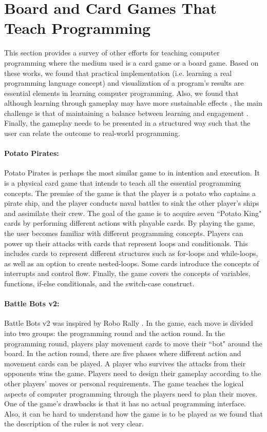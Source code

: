 \section{Board and Card Games That Teach Programming}

This section provides a survey of other efforts for teaching computer programming where the medium used is a card game or a board game. 
Based on these works, we found that practical implementation (i.e. learning a real programming language concept) and visualization of a program's results are essential elements in learning computer programming. Also, we found that although learning through gameplay may have more sustainable effects \cite{effectivenessofgames}, the main challenge is that of maintaining a balance between learning and engagement \cite{educationalgamedesign}. Finally, the gameplay needs to be presented in a structured way such that the user can relate the outcome to real-world programming.

\paragraph{Potato Pirates:}
Potato Pirates \cite{PotatoPirates} is perhaps the most similar game to \gameName in intention and execution. It is a physical card game that intends to teach all the essential programming concepts. The premise of the game is that the player is a potato who captains a pirate ship, and the player conducts naval battles to sink the other player's ships and assimilate their crew. The goal of the game is to acquire seven ``Potato King" cards by performing different actions with playable cards. By playing the game, the user becomes familiar with different programming concepts. Players can power up their attacks with cards that represent loops and conditionals. This includes cards to represent different structures such as for-loops and while-loops, as well as an option to create nested-loops. Some cards introduce the concepts of interrupts and control flow. Finally, the game covers the concepts of variables, functions, if-else conditionals, and the switch-case construct.

\paragraph{Battle Bots v2:}
Battle Bots v2 \cite{BattleBotsv2}  was inspired by Robo Rally \cite{roborally}. In the game, each move is divided into two groups: the programming round and the action round. In the programming round, players play movement cards to move their ``bot" around the board. In the action round, there are five phases where different action and movement cards can be played. A player who survives the attacks from their opponents wins the game. Players need to design their gameplay according to the other players’ moves or personal requirements. The game teaches the logical aspects of computer programming through the players need to plan their moves. One of the game's drawbacks is that it has no actual programming interface. Also, it can be hard to understand how the game is to be played as we found that the description of the rules is not very clear.


